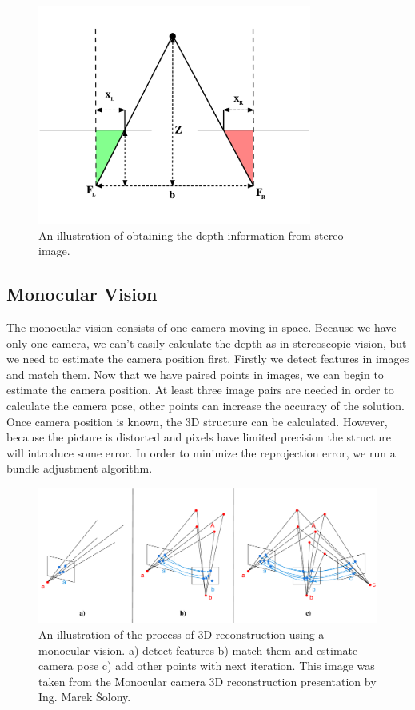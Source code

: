 \begin{figure}[ht]
	\begin{center}
		\includegraphics[keepaspectratio,width=9cm]{fig/stereo.pdf}
	\end{center}
	\caption{An illustration of obtaining the depth information from stereo image.}
	\label{fig:stereo}
\end{figure}

\subsection*{Monocular Vision}
The monocular vision consists of one camera moving in space. Because we have only one camera, we can't easily calculate the depth as in stereoscopic vision, but we need to estimate the camera position first. Firstly we detect features in images and match them. Now that we have paired points in images, we can begin to estimate the camera position. At least three image pairs are needed in order to calculate the camera pose, other points can increase the accuracy of the solution. Once camera position is known, the 3D structure can be calculated. However, because the picture is distorted and pixels have limited precision the structure will introduce some error. In order to minimize the reprojection error, we run a bundle adjustment algorithm.

\begin{figure}[ht]
	\begin{center}
		\includegraphics[keepaspectratio,width=\textwidth]{fig/mono.pdf}
	\end{center}
	\caption{An illustration of the process of 3D reconstruction using a monocular vision. a) detect features b) match them and estimate camera pose c) add other points with next iteration. This image was taken from the Monocular camera 3D reconstruction presentation by Ing. Marek Šolony.}
	\label{fig:mono}
\end{figure}

